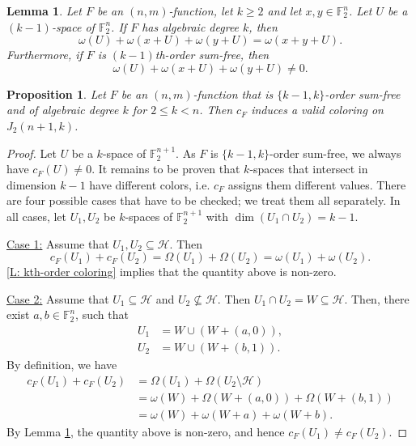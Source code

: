 \documentclass[10pt,a4paper]{amsart}
\newtheorem{lem}{Lemma}
\newtheorem{prop}{Proposition}
\newcommand{\F}{\mathbb F}
\newcommand{\HH}{\mathcal{H}}
\begin{document}
\begin{lem} \label{L: special condition} 
    Let $F$ be an $(n,m)$-function, let $k\geq 2$ and let $x, y \in \F_{2}^n$. Let $U$ be a $(k-1)$-space of $\F_2^n$. If $F$ has algebraic degree $k$, then $$\omega(U)+\omega(x+U)+\omega(y+U)=\omega(x+y+U).$$
    Furthermore, if $F$ is $(k-1)$th-order sum-free, then 
    $$
    \omega(U)+\omega(x+U)+\omega(y+U) \neq 0.
    $$
\end{lem}

\begin{prop} \label{P: constructive Prove of Them 5.1} 
   Let $F$ be an $(n,m)$-function that is $\{k-1,k\}$-order sum-free and of algebraic degree $k$ for $2\leq k<n$. Then $c_F$ induces a valid coloring on $J_2(n+1,k)$.
\end{prop} 

\begin{proof}
Let $U$ be a $k$-space of $\F_2^{n+1}$. As $F$ is $\{k-1,k\}$-order sum-free, we always have  $c_F(U)\ne0$.
   It remains to be proven that $k$-spaces that intersect in dimension $k-1$ have different colors, i.e. $c_F$ assigns them different values.
There are four possible cases that have to be checked; we treat them all separately. In all cases, let $U_1,U_2$ be $k$-spaces of $\F_2^{n+1}$ with $\dim(U_1\cap U_2)=k-1$.

    \noindent \underline{Case 1:} Assume that $U_1,U_2\subseteq \HH$. Then 
    $$
    c_F(U_1) + c_F(U_2) = \Omega(U_1) + \Omega(U_2) =\omega(U_1) + \omega(U_2).
    $$
 \cref{L: kth-order coloring} implies that the quantity above is non-zero.
  

    \noindent \underline{Case 2:}  Assume that $U_1\subseteq \HH$  and  $U_2\not \subseteq \HH$. Then $U_1 \cap U_2 = W \subseteq \mathcal{H}$. 
    Then, there exist  $a,b\in \F_2^n$, such that 
    \begin{align*}
         U_1 &= W \cup (W + (a, 0)), \\
         U_2 &= W \cup (W+(b, 1)).
     \end{align*}
    By definition, we have 
    \begin{align*}
         c_F(U_1) + c_F(U_2)  &=\Omega(U_1) + \Omega(U_2\setminus \HH) \\
      &= \omega(W) + \Omega(W +(a, 0)) + \Omega(W +(b,1))\\
      &= \omega(W) + \omega(W +a) + \omega(W +b).
     \end{align*}
By Lemma \ref{L: special condition}, the quantity above is non-zero, and hence $c_F(U_1) \neq c_F(U_2)$.
    


\end{proof}
\end{document}

